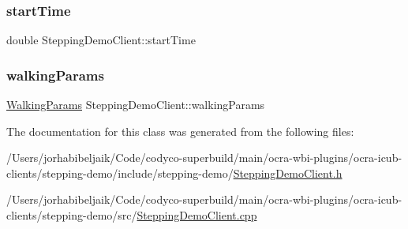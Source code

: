 \subsubsection{\texorpdfstring{start\+Time}{startTime}}
{\footnotesize\ttfamily double Stepping\+Demo\+Client\+::start\+Time\hspace{0.3cm}{\ttfamily [private]}}

\hypertarget{classSteppingDemoClient_a113c2d838e3db1d18f4843a8828e30d4}{}\label{classSteppingDemoClient_a113c2d838e3db1d18f4843a8828e30d4} 
\subsubsection{\texorpdfstring{walking\+Params}{walkingParams}}
{\footnotesize\ttfamily \hyperlink{structWalkingParams}{Walking\+Params} Stepping\+Demo\+Client\+::walking\+Params\hspace{0.3cm}{\ttfamily [private]}}



The documentation for this class was generated from the following files\+:\begin{DoxyCompactItemize}
\item 
/\+Users/jorhabibeljaik/\+Code/codyco-\/superbuild/main/ocra-\/wbi-\/plugins/ocra-\/icub-\/clients/stepping-\/demo/include/stepping-\/demo/\hyperlink{SteppingDemoClient_8h}{Stepping\+Demo\+Client.\+h}\item 
/\+Users/jorhabibeljaik/\+Code/codyco-\/superbuild/main/ocra-\/wbi-\/plugins/ocra-\/icub-\/clients/stepping-\/demo/src/\hyperlink{SteppingDemoClient_8cpp}{Stepping\+Demo\+Client.\+cpp}\end{DoxyCompactItemize}
